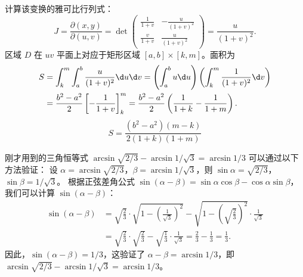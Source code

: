 \begin{solution}
    计算该变换的雅可比行列式：
    \begin{equation}
        J = \frac{\partial(x, y)}{\partial(u, v)} = \det \begin{pmatrix} \frac{1}{1+v} & -\frac{u}{(1+v)^2} \\ \frac{v}{1+v} & \frac{u}{(1+v)^2} \end{pmatrix} = \frac{u}{(1+v)^2}.
    \end{equation}
    区域 $D$ 在 $uv$ 平面上对应于矩形区域 $[a, b] \times [k, m]$。面积为
    \begin{equation}
        \begin{aligned}
            S & = \int_{k}^{m} \int_{a}^{b} \frac{u}{(1+v)^2} \d u \d v = \left( \int_{a}^{b} u \d u \right) \left( \int_{k}^{m} \frac{1}{(1+v)^2} \d v \right) \\
              & = \frac{b^2 - a^2}{2} \left[ -\frac{1}{1+v} \right]_{k}^{m} = \frac{b^2 - a^2}{2} \left( \frac{1}{1+k} - \frac{1}{1+m} \right).
        \end{aligned}
    \end{equation}
    \begin{equation}
        S = \boxed{\frac{(b^2 - a^2)(m - k)}{2(1+k)(1+m)}}
    \end{equation}
\end{solution}

\begin{note}{}{}
    刚才用到的三角恒等式 $\arcsin \sqrt{2/3} - \arcsin 1/\sqrt{3} = \arcsin 1/3$ 可以通过以下方法验证：
    设 $\alpha = \arcsin \sqrt{2/3}$，$\beta = \arcsin 1/\sqrt{3}$，则 $\sin \alpha = \sqrt{2/3}$，$\sin \beta = 1/\sqrt{3}$。
    根据正弦差角公式 $\sin(\alpha - \beta) = \sin \alpha \cos \beta - \cos \alpha \sin \beta$，我们可以计算 $\sin(\alpha - \beta)$：
    \begin{equation}
        \begin{aligned}
            \sin(\alpha - \beta) & = \sqrt{\frac{2}{3}} \cdot \sqrt{1 - \left(\frac{1}{\sqrt{3}}\right)^2} - \sqrt{1 - \left(\sqrt{\frac{2}{3}}\right)^2} \cdot \frac{1}{\sqrt{3}} \\
                                 & = \sqrt{\frac{2}{3}} \cdot \sqrt{\frac{2}{3}} - \sqrt{\frac{1}{3}} \cdot \frac{1}{\sqrt{3}} = \frac{2}{3} - \frac{1}{3} = \frac{1}{3}.
        \end{aligned}
    \end{equation}
    因此，$\sin(\alpha - \beta) = 1/3$，这验证了 $\alpha - \beta = \arcsin 1/3$，即 $\arcsin \sqrt{2/3} - \arcsin 1/\sqrt{3} = \arcsin 1/3$。
\end{note}

